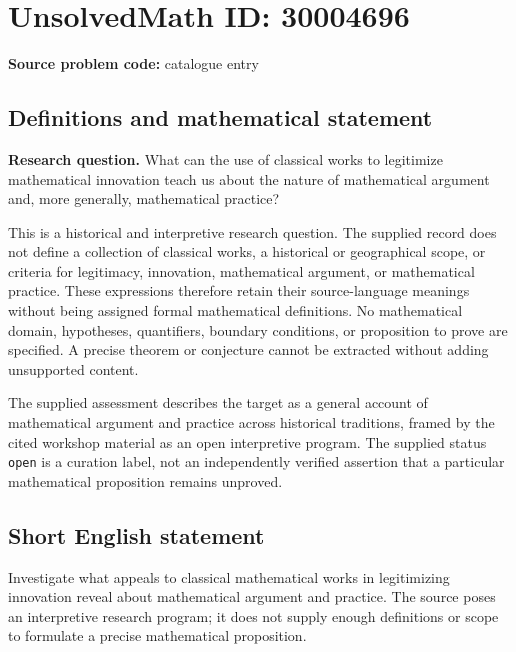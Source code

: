 \documentclass[11pt]{article}
\begin{document}
\section*{UnsolvedMath ID: 30004696}
\textbf{Source problem code:} catalogue entry
\subsection{Definitions and mathematical statement}
\textbf{Research question.} What can the use of classical works to legitimize mathematical innovation teach us about the nature of mathematical argument and, more generally, mathematical practice?

This is a historical and interpretive research question. The supplied record does not define a collection of classical works, a historical or geographical scope, or criteria for legitimacy, innovation, mathematical argument, or mathematical practice. These expressions therefore retain their source-language meanings without being assigned formal mathematical definitions. No mathematical domain, hypotheses, quantifiers, boundary conditions, or proposition to prove are specified. A precise theorem or conjecture cannot be extracted without adding unsupported content.

The supplied assessment describes the target as a general account of mathematical argument and practice across historical traditions, framed by the cited workshop material as an open interpretive program. The supplied status \texttt{open} is a curation label, not an independently verified assertion that a particular mathematical proposition remains unproved.
\subsection{Short English statement}
Investigate what appeals to classical mathematical works in legitimizing innovation reveal about mathematical argument and practice. The source poses an interpretive research program; it does not supply enough definitions or scope to formulate a precise mathematical proposition.
\end{document}
